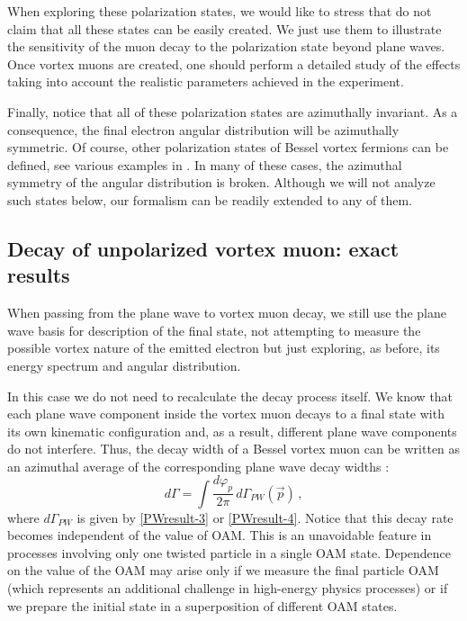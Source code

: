 \documentclass[aps,prd,longbibliography,nofootinbib,amsthm,amsmath,amssymb,amsfonts,notitlepage]{revtex4-1}
\begin{document}
When exploring these polarization states, we would like to stress that do not claim that all these states can be easily created.
We just use them to illustrate the sensitivity of the muon decay to the polarization state beyond plane waves.
Once vortex muons are created, one should perform a detailed study of the effects taking into account the realistic parameters
achieved in the experiment.

Finally, notice that all of these polarization states are azimuthally invariant.
As a consequence, the final electron angular distribution
will be azimuthally symmetric.
Of course, other polarization states of Bessel vortex fermions can be defined, see various examples
in \cite{Sarenac:2018}. In many of these cases, the azimuthal symmetry of the angular distribution is broken.
Although we will not analyze such states below, our formalism can be readily extended to any of them.

\subsection{Decay of unpolarized vortex muon: exact results}

When passing from the plane wave to vortex muon decay, we still use the plane wave basis for description
of the final state, not attempting to measure the possible vortex nature of the emitted electron
but just exploring, as before, its energy spectrum and angular distribution.

In this case we do not need to recalculate the decay process itself. We know that each plane wave component
inside the vortex muon decays to a final state with its own kinematic configuration and, as a result, different
plane wave components do not interfere. Thus, the decay width of a Bessel vortex muon can be written
as an azimuthal average of the corresponding plane wave decay widths \cite{Ivanov:2011kk}:
\begin{equation}
d{\Gamma} = \int \frac{d\varphi_p}{2\pi}\, d\Gamma_{PW}(\vec p)\,,\label{vortex-decay-1}
\end{equation}
where $d\Gamma_{PW}$ is given by \eqref{PWresult-3} or \eqref{PWresult-4}.
Notice that this decay rate becomes independent of the value of OAM. This is an unavoidable feature
in processes involving only one twisted particle in a single OAM state.
Dependence on the value of the OAM may arise only if we measure the final particle OAM 
(which represents an additional challenge in high-energy physics processes)
or if we prepare the initial state in a superposition of different OAM states.
\end{document}
